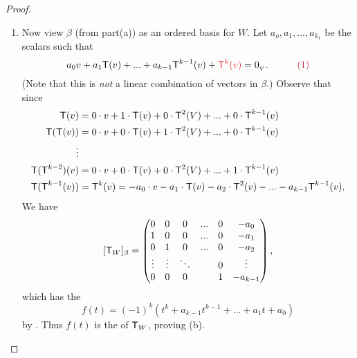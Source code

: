 \begin{proof}
\begin{enumerate}
\item Now view \(\beta\) (from part(a)) as an ordered basis for \(W\).
Let \(a_o, a_1, ..., a_{k_1}\) be the scalars such that
\[
    a_0 v + a_1 \T(v) + ... + a_{k - 1} \T^{k - 1} (v) + \RED{\T^k(v)} = \OV. \quad \quad \quad \MAROON{(1)}
\]
(Note that this is \emph{not} a linear combination of vectors in \(\beta\).)
Observe that since
\begin{align*}
    \textsf{T}(v) & = 0 \cdot v + 1 \cdot \textsf{T}(v) + 0 \cdot \textsf{T}^2(V) + ... + 0 \cdot \textsf{T}^{k - 1}(v) \\
    \textsf{T}(\textsf{T}(v)) & = 0 \cdot v + 0 \cdot \textsf{T}(v) + 1 \cdot \textsf{T}^2(V) + ... + 0 \cdot \textsf{T}^{k - 1}(v) \\
    \vdots \\
    \textsf{T}(\textsf{T}^{k - 2})(v) & = 0 \cdot v + 0 \cdot \textsf{T}(v) + 0 \cdot \textsf{T}^2(V) + ... + 1 \cdot \textsf{T}^{k - 1}(v) \\
    \textsf{T}(\textsf{T}^{k - 1}(v)) & = \textsf{T}^k(v) = -a_0 \cdot v -a_1 \cdot \textsf{T}(v) - a_2 \cdot \textsf{T}^2(v) - ... - a_{k - 1} \textsf{T}^{k - 1}(v),
\end{align*}
We have
\[
    [\textsf{T}_W]_{\beta} = \begin{pmatrix}
        0 & 0 & 0 & ... & 0 & -a_0 \\
        1 & 0 & 0 & ... & 0 & -a_1 \\
        0 & 1 & 0 & ... & 0 & -a_2 \\
        \vdots & \vdots & \ddots & & 0 & \vdots \\
        0 & 0 & 0 & & 1 & -a_{k - 1}
    \end{pmatrix},
\]
which has the \CPOLY{}
\[
    f(t) = (-1)^k (t^k + a_{k - 1} t^{k-1} + ... + a_1 t + a_0)
\]
by .
Thus \(f(t)\) is the \CPOLY{} of \(\textsf{T}_W\), proving (b).
\end{enumerate}
\end{proof}

